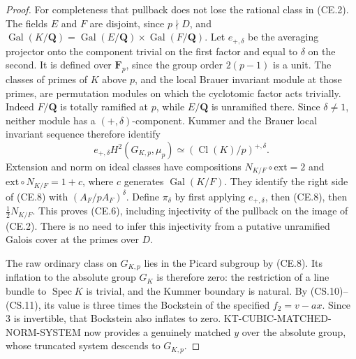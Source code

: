 \begin{proof}
For completeness that pullback does not lose the rational
class in (CE.2).  The fields \(E\) and \(F\) are disjoint,
since \(p\nmid D\), and
\(\operatorname{Gal}(K/\mathbf Q)
  =\operatorname{Gal}(E/\mathbf Q)\times\operatorname{Gal}(F/\mathbf Q)\).
Let \(e_{+,\delta}\) be the averaging projector onto the
component trivial on the first factor and equal to \(\delta\)
on the second.  It is defined over \(\mathbf F_p\), since
the group order \(2(p-1)\) is a unit.
The classes of primes of \(K\) above \(p\), and the local
Brauer invariant module at those primes, are permutation
modules on which the cyclotomic factor acts trivially.
Indeed \(F/\mathbf Q\) is totally ramified at \(p\), while
\(E/\mathbf Q\) is unramified there.  Since \(\delta\ne1\),
neither module has a \((+,\delta)\)-component.  Kummer and
the Brauer local invariant sequence therefore identify
\[
 e_{+,\delta} H^2(G_{K,p},\mu_p)
       \simeq (\operatorname{Cl}(K)/p)^{{+,\delta}}.
                                                        \tag{CE.8}
\]
Extension and norm on ideal classes have compositions
\(N_{K/F}\circ\mathrm{ext}=2\) and
\(\mathrm{ext}\circ N_{K/F}=1+c\), where
\(c\) generates \(\operatorname{Gal}(K/F)\).
They identify the right side of (CE.8) with
\((A_F/pA_F)^\delta\).  Define \(\pi_\delta\) by first
applying \(e_{+,\delta}\), then (CE.8), then
\(\tfrac12N_{K/F}\).  This proves (CE.6), including
injectivity of the pullback on the image of (CE.2).
There is no need to infer this injectivity from a putative
unramified Galois cover at the primes over \(D\).

The raw ordinary class on \(G_{K,p}\) lies in the
Picard subgroup by (CE.8).  Its inflation to the
absolute group \(G_K\) is therefore zero: the
restriction of a line bundle to \(\operatorname{Spec}K\)
is trivial, and the Kummer boundary is natural.
By (CS.10)--(CS.11), its value is three times the
Bockstein of the specified \(f_2=v-ax\).  Since
\(3\) is invertible, that Bockstein also inflates
to zero.  KT-CUBIC-MATCHED-NORM-SYSTEM now provides
a genuinely matched \(y\) over the absolute group,
whose truncated system descends to \(G_{K,p}\).


\end{proof}

